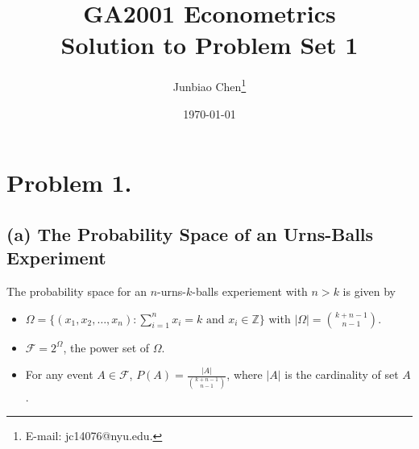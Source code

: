 \documentclass[11pt]{article}
\title{GA2001 Econometrics \\Solution to Problem Set 1}
\author{
Junbiao Chen\thanks{E-mail: jc14076@nyu.edu.}
}
\date{\today}
\theoremstyle{definition}
\theoremstyle{boldtitle} %
\numberwithin{equation}{section}
\numberwithin{figure}{section}
\numberwithin{table}{section}
\begin{document}
\maketitle
\section*{Problem 1.}
\subsection*{(a) The Probability Space of an Urns-Balls Experiment} 
The probability space for an $n$-urns-$k$-balls experiement with $n > k$ is given by 
\begin{itemize}
  \item $\Omega = \{(x_1, x_2, \dots, x_n): \sum_{i=1}^n x_i = k \text{ and } x_i \in \mathbb{Z} \}$ with $|\Omega| = \binom{k+n-1}{n-1}$.
  \item $\mathcal{F} = 2^{\Omega}$, the power set of $\Omega$.
  \item For any event $A \in \mathcal{F}$, $P(A) = \frac{|A|}{\binom{k+n-1}{n-1}}$, where $|A|$ is the cardinality of set $A$.
\end{itemize}
\end{document}
